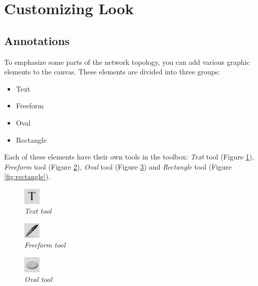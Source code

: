 \section{Customizing Look}
\subsection{Annotations}
To emphasize some parts of the network topology, you can add various graphic
elements to the canvas. These elements are divided into three groups:
\begin{itemize}
    \item Text
    \item Freeform
    \item Oval
    \item Rectangle
\end{itemize}
Each of these elements have their own tools in the toolbox: \emph{Text} tool
(Figure \ref{fig:text}), \emph{Freeform} tool (Figure \ref{fig:freeform}),
\emph{Oval} tool (Figure \ref{fig:oval}) and \emph{Rectangle} tool (Figure
\ref{fig:rectangle}).

\begin{figure}[H]
  \centering
  \vspace{10pt}
  \includegraphics[width=0.07\textwidth]{./images/text_tool.png}
  \caption{\emph{Text tool}}
  \label{fig:text}
\end{figure}

\begin{figure}[H]
  \centering
  \vspace{10pt}
  \includegraphics[width=0.07\textwidth]{./images/freeform_tool.png}
  \caption{\emph{Freeform tool}}
  \label{fig:freeform}
\end{figure}

\begin{figure}[H]
  \centering
  \vspace{10pt}
  \includegraphics[width=0.07\textwidth]{./images/oval_tool.png}
  \caption{\emph{Oval tool}}
  \label{fig:oval}
\end{figure}

